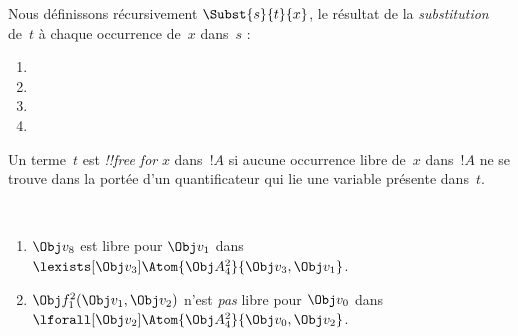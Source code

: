 \documentclass[../../../include/open-logic-section]{subfiles}
\begin{document}


\begin{defn}
Nous définissons récursivement $\Subst{s}{t}{x}$, le résultat de la
\emph{substitution} de~$t$ à chaque occurrence de~$x$ dans~$s$ :
\begin{enumerate}
\item {}

\item {}

\item {}

\item{}
\end{enumerate}
\end{defn}

\begin{defn}
Un terme~$t$ est \emph{!!{free for}} $x$ dans~$!A$ si aucune occurrence
libre de~$x$ dans~$!A$ ne se trouve dans la portée d'un quantificateur
qui lie une variable présente dans~$t$.
\end{defn}

\begin{ex} ~
\begin{enumerate}
\item $\Obj v_8$ est libre pour $\Obj v_1$ dans
  $\lexists[\Obj v_3]\Atom{\Obj A^2_4}{\Obj v_3,\Obj v_1}$.

\item $\Obj f^2_1(\Obj v_1, \Obj v_2)$ n'est \emph{pas} libre pour
  $\Obj v_0$ dans
  $\lforall[\Obj v_2]\Atom{\Obj A^2_4}{\Obj v_0,\Obj v_2}$.
\end{enumerate}
\end{ex}
\end{document}
